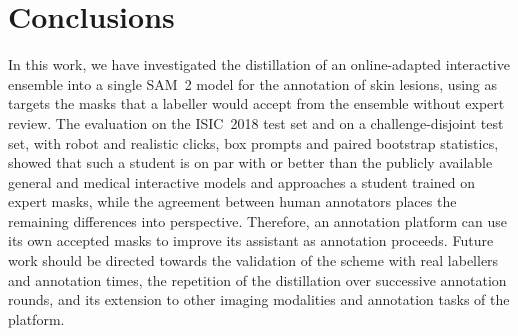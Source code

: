 \documentclass[runningheads]{llncs}
\begin{document}
\section{Conclusions}\label{sec:conclusions}

In this work, we have investigated the distillation of an online-adapted interactive ensemble into a single SAM~2 model for the annotation of skin lesions, using as targets the masks that a labeller would accept from the ensemble without expert review. The evaluation on the ISIC~2018 test set and on a challenge-disjoint test set, with robot and realistic clicks, box prompts and paired bootstrap statistics, showed that such a student is on par with or better than the publicly available general and medical interactive models and approaches a student trained on expert masks, while the agreement between human annotators places the remaining differences into perspective. Therefore, an annotation platform can use its own accepted masks to improve its assistant as annotation proceeds. Future work should be directed towards the validation of the scheme with real labellers and annotation times, the repetition of the distillation over successive annotation rounds, and its extension to other imaging modalities and annotation tasks of the platform.



\end{document}
